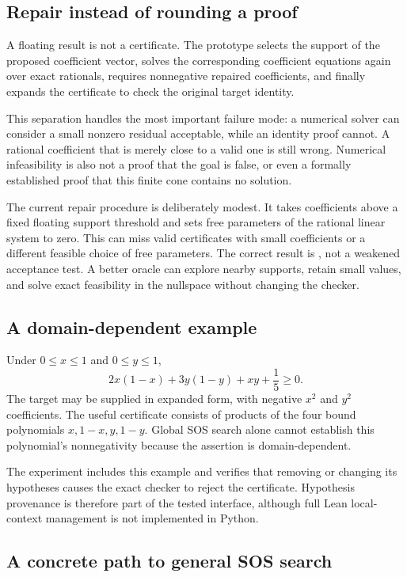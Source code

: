 \subsection{Repair instead of rounding a proof}

A floating result is not a certificate. The prototype selects the support of the proposed coefficient vector, solves the corresponding coefficient equations again over exact rationals, requires nonnegative repaired coefficients, and finally expands the certificate to check the original target identity.

This separation handles the most important failure mode: a numerical solver can consider a small nonzero residual acceptable, while an identity proof cannot. A rational coefficient that is merely close to a valid one is still wrong. Numerical infeasibility is also not a proof that the goal is false, or even a formally established proof that this finite cone contains no solution.

The current repair procedure is deliberately modest. It takes coefficients above a fixed floating support threshold and sets free parameters of the rational linear system to zero. This can miss valid certificates with small coefficients or a different feasible choice of free parameters. The correct result is \unknown{}, not a weakened acceptance test. A better oracle can explore nearby supports, retain small values, and solve exact feasibility in the nullspace without changing the checker.

\subsection{A domain-dependent example}

Under $0\le x\le1$ and $0\le y\le1$,
\[
 2x(1-x)+3y(1-y)+xy+\frac15\ge0.
\]
The target may be supplied in expanded form, with negative $x^2$ and $y^2$ coefficients. The useful certificate consists of products of the four bound polynomials $x,1-x,y,1-y$. Global SOS search alone cannot establish this polynomial's nonnegativity because the assertion is domain-dependent.

The experiment includes this example and verifies that removing or changing its hypotheses causes the exact checker to reject the certificate. Hypothesis provenance is therefore part of the tested interface, although full Lean local-context management is not implemented in Python.

\subsection{A concrete path to general SOS search}

